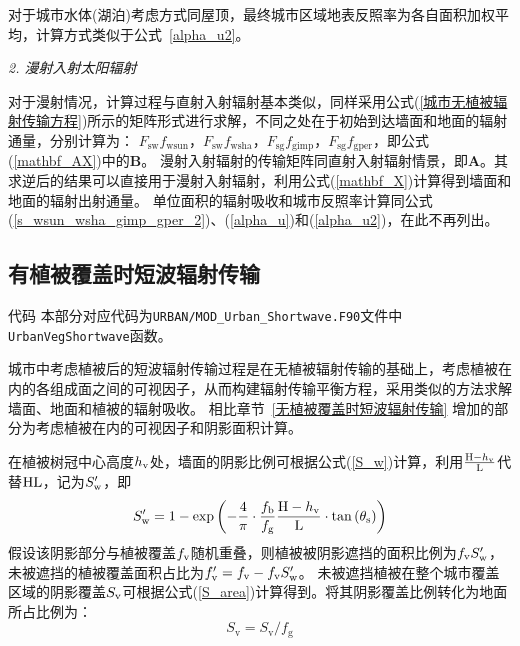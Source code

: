 对于城市水体(湖泊)考虑方式同屋顶，最终城市区域地表反照率为各自面积加权平均，计算方式类似于公式~\eqref{alpha_u2}。

\textit{2. 漫射入射太阳辐射}

对于漫射情况，计算过程与直射入射辐射基本类似，同样采用公式(\ref{城市无植被辐射传输方程})所示的矩阵形式进行求解，不同之处在于初始到达墙面和地面的辐射通量，分别计算为：
$F_{\mathrm{sw}}f_{\mathrm{wsun}}$，$F_{\mathrm{sw}}f_{\mathrm{wsha}}$，$F_{\mathrm{sg}}f_{\mathrm{gimp}}$，$F_{\mathrm{sg}}f_{\mathrm{gper}}$，即公式(\ref{mathbf_AX})中的$\mathbf{B}$。
漫射入射辐射的传输矩阵同直射入射辐射情景，即$\mathbf{A}$。其求逆后的结果可以直接用于漫射入射辐射，利用公式(\ref{mathbf_X})计算得到墙面和地面的辐射出射通量。
单位面积的辐射吸收和城市反照率计算同公式(\ref{s_wsun_wsha_gimp_gper_2})、(\ref{alpha_u})和(\ref{alpha_u2})，在此不再列出。

\subsection{有植被覆盖时短波辐射传输}\label{有植被覆盖时短波辐射传输}
\begin{mymdframed}{代码}
  本部分对应代码为\texttt{URBAN/MOD\_Urban\_Shortwave.F90}文件中\texttt{UrbanVegShortwave}函数。
\end{mymdframed}

城市中考虑植被后的短波辐射传输过程是在无植被辐射传输的基础上，考虑植被在内的各组成面之间的可视因子，从而构建辐射传输平衡方程，采用类似的方法求解墙面、地面和植被的辐射吸收。
相比章节~\ref{无植被覆盖时短波辐射传输} 增加的部分为考虑植被在内的可视因子和阴影面积计算。

在植被树冠中心高度$h_{\rm v}$处，墙面的阴影比例可根据公式(\ref{S_w})计算，利用$\frac{{\rm H}-h_{\rm v}}{\rm L}$代替$\rm HL$，记为$S_{\rm w}^\prime$，即
\begin{equation}
  S_{\mathrm{w}}^{\prime}=1-\exp \left(-\frac{4}{\pi} \cdot \frac{f_{\mathrm{b}}}{f_{\mathrm{g}}} \frac{{\rm H}-h_{\mathrm{v}}}{\rm L} \cdot \tan \left(\theta_{\mathrm{s}}\right)\right)
\end{equation}
假设该阴影部分与植被覆盖$f_{\rm v}$随机重叠，则植被被阴影遮挡的面积比例为$f_{\rm v}S_{\mathrm {w}} ^\prime$，未被遮挡的植被覆盖面积占比为$f_{\rm v}^\prime=f_{\rm v}-f_{\rm v}S_{\rm w}^\prime$。
未被遮挡植被在整个城市覆盖区域的阴影覆盖$S_{\rm v}$可根据公式(\ref{S_area})计算得到。将其阴影覆盖比例转化为地面所占比例为：
\begin{equation}\label{S_v2}
  S_{\mathrm{v}}=S_{\mathrm{v}} / f_{\mathrm{g}}
\end{equation}

